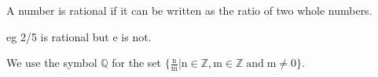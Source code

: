 A number is rational if it can be written as the ratio of two
whole numbers.
\par
eg 2/5 is rational but e is not.
\par
We use the symbol $ \mathbb{Q} $ for the set $ \{ \frac{\mathrm{n}}{\mathrm{m}}
| \mathrm{n} \in \mathbb{Z} , \mathrm{m} \in \mathbb{Z} \; \mathrm{and}
\; \mathrm{m} \neq 0 \}  . $